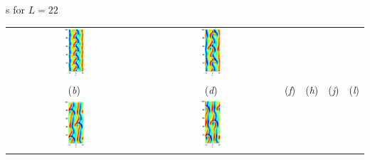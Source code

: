 \documentclass{theo1poster}[2003/04/25]
\begin{document}
\begin{poster}{3}
\begin{sheet}{\Rpo s for $L=22$}
\begin{center}
\begin{tabular}{cccccc}
\includegraphics[width=0.15\textwidth]{../../figs/ks22rpo020.5-00.00.eps}\hspace{-4ex} &
\includegraphics[width=0.15\textwidth]{../../figs/ks22rpo066.8-00.00.eps}\\
(\textit{b}) & (\textit{d}) & (\textit{f}) &
(\textit{h}) & (\textit{j}) & (\textit{l})\\
\includegraphics[width=0.15\textwidth]{../../figs/ks22rpo032.8-10.96.eps}\hspace{-4ex} &
\includegraphics[width=0.15\textwidth]{../../figs/ks22rpo034.6-09.60.eps}\hspace{-4ex} &

\end{tabular}
\end{center}
\end{sheet}
\end{poster}
\end{document}

